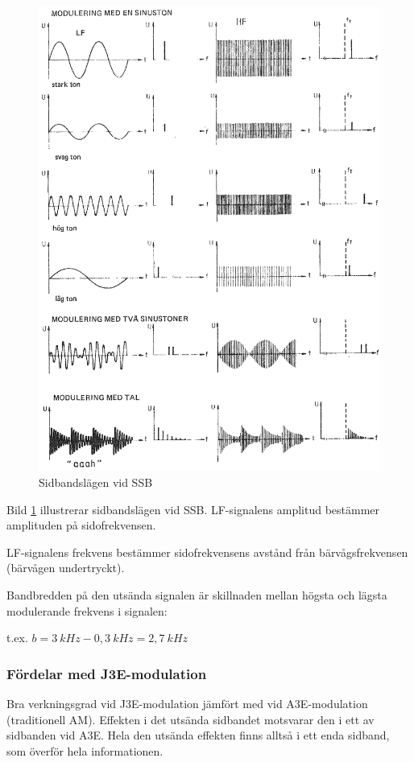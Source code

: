 \begin{figure}
\includegraphics[width=\textwidth]{images/cropped_pdfs/bild_2_1-29.pdf}
\caption{Sidbandslägen vid SSB}
\label{fig:BildII1-29}
\end{figure}

Bild \ref{fig:BildII1-29} illustrerar sidbandslägen vid SSB.
LF-signalens amplitud bestämmer amplituden på sidofrekvensen.

LF-signalens frekvens bestämmer sidofrekvensens avstånd från bärvågsfrekvensen
(bärvågen undertryckt).

Bandbredden på den utsända signalen är skillnaden mellan högsta och lägsta
modulerande frekvens i signalen:

t.ex. \(b = 3~kHz - 0,3~kHz = 2,7~kHz\)

\subsubsection{Fördelar med J3E-modulation}
Bra verkningsgrad vid J3E-modulation jämfört med vid A3E-modulation
(traditionell AM).
Effekten i det utsända sidbandet motsvarar den i ett av sidbanden vid A3E.
Hela den utsända effekten finns alltså i ett enda sidband,
som överför hela informationen.

